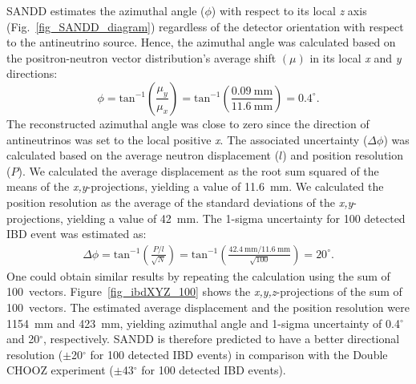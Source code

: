 \documentclass[final,5p,times,twocolumn]{elsarticle}
\begin{document}
SANDD estimates the azimuthal angle ($\phi$) with respect to its local \textit{z} axis (Fig.~\ref{fig_SANDD_diagram}) regardless of the detector orientation with respect to the antineutrino source. Hence, the azimuthal angle was calculated based on the positron-neutron vector distribution's average shift $(\mu)$ in its local \textit{x} and \textit{y} directions:
%
\begin{equation} \label{eq_sandd_azimuthalAngle}
    \phi = \textrm{tan}^{-1}\left(\frac{\mu_y}{\mu_x}\right) = \textrm{tan}^{-1}\left(\frac{0.09~\textrm{mm}}{11.6~\textrm{mm}}\right) = 0.4^\circ.
\end{equation}
%
The reconstructed azimuthal angle was close to zero since the direction of antineutrinos was set to the local positive \textit{x}. The associated uncertainty ($\Delta\phi$) was calculated based on the average neutron displacement ($l$) and position resolution ($P$).
We calculated the average displacement as the root sum squared of the means of the \textit{x,y}-projections, yielding a value of 11.6~mm. 
We calculated the position resolution as the average of the standard deviations of the \textit{x,y}-projections, yielding a value of 42~mm.
The 1-sigma uncertainty for 100 detected IBD event was estimated as:
%
%
\begin{equation} \label{eq_sandd_aveDisplacement}
\begin{aligned}
    \Delta\phi {} = \textrm{tan}^{-1}\left(\frac{P/l}{\sqrt{N}}\right) = \textrm{tan}^{-1}\left(\frac{42.4~\textrm{mm}/11.6~\textrm{mm}}{\sqrt{100}}\right)  = 20^\circ.
\end{aligned}
\end{equation}
One could obtain similar results by repeating the calculation using the sum of 100~vectors. Figure~\ref{fig_ibdXYZ_100} shows the \textit{x,y,z}-projections of the sum of 100~vectors. The estimated average displacement and the position resolution were 1154~mm and 423~mm, yielding azimuthal angle and 1-sigma uncertainty of 0.4$^\circ$ and 20$^\circ$, respectively.
SANDD is therefore predicted to have a better directional resolution ($\pm$20$^\circ$ for 100 detected IBD events) in comparison with the Double CHOOZ experiment ($\pm$43$^\circ$ for 100 detected IBD events).
\end{document}
